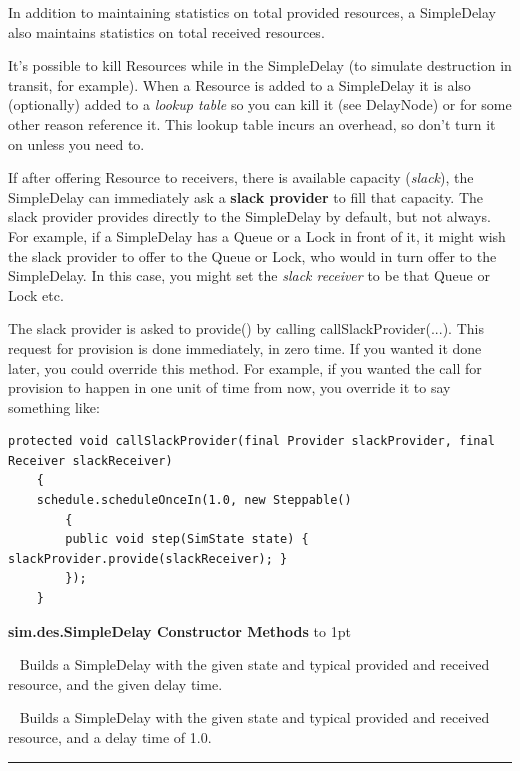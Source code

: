 \documentclass[twoside,10pt]{article}
\newcommand\class[1]{\index{Classes!{#1}}\textsf{#1}}
\newcommand*{\xfill}[1][0pt]{%
	\cleaders
		\hbox to 1pt{\hss
			\raisebox{#1}{\rule{1.2pt}{0.4pt}}%
			\hss}\hfill}
\newenvironment{methods}[1]{
\vspace{1.0em}\noindent\textsf{\textbf{#1 Methods}}\quad \xfill[0.5ex]
\vspace{-0.25em}
\begin{description}
\small}
{\end{description}\hrule\vspace{1.5em}}
\newcommand{\mthd}[1]{\item[{\sf #1}]~\newline}
\begin{document}
In addition to maintaining statistics on total provided resources, a SimpleDelay also maintains statistics on total received resources.

It's possible to kill Resources while in the SimpleDelay (to simulate destruction in transit, for example).  When a Resource is added to a SimpleDelay it is also (optionally) added to a {\it lookup table} so you can kill it (see DelayNode) or for some other reason reference it.  This lookup table incurs an overhead, so don't turn it on unless you need to.

If after offering Resource to receivers, there is available capacity ({\it slack}), the SimpleDelay can immediately ask a {\bf slack provider} to fill that capacity.  The slack provider provides directly to the SimpleDelay by default, but not always.  For example, if a SimpleDelay has a Queue or a Lock in front of it, it might wish the slack provider to offer to the Queue or Lock, who would in turn offer to the SimpleDelay.  In this case, you might set the {\it slack receiver} to be that Queue or Lock etc.

The slack provider is asked to provide() by calling callSlackProvider(...).  This request for provision is done immediately, in zero time.  If you wanted it done later, you could override this method.  For example, if you wanted the call for provision to happen in one unit of time from now, you override it to say something like:

\begin{verbatim}
protected void callSlackProvider(final Provider slackProvider, final Receiver slackReceiver)
    {
    schedule.scheduleOnceIn(1.0, new Steppable()
        {
        public void step(SimState state) { slackProvider.provide(slackReceiver); }
        });
    }
\end{verbatim}

\begin{methods}{\class{sim.des.SimpleDelay} Constructor}
\mthd{public SimpleDelay(SimState state, double delayTime, Resource typical)}
Builds a SimpleDelay with the given state and typical provided and received resource, and the given delay time.
\mthd{public SimpleDelay(SimState state, Resource typical)}
Builds a SimpleDelay with the given state and typical provided and received resource, and a delay time of 1.0.
\end{methods}
\end{document}
